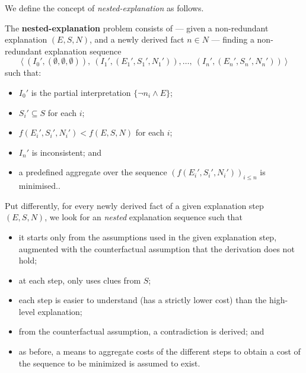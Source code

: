 




We define the concept of \emph{nested-explanation} as follows. 

\begin{definition}
The \textbf{nested-explanation} problem consists of --- given a non-redundant explanation $(E, S, N)$, and a newly derived fact $n \in N$ --- finding a non-redundant explanation sequence 
    \[\langle \ (I_0',(\emptyset,\emptyset,\emptyset)),\ (I_1',(E_1',S_1',N_1')), \dots ,\ (I_n',(E_n',S_n',N_n')) \ \rangle\]
    such that:
    \begin{itemize}
        \item $I_0'$ is the partial interpretation $\{ \neg n_i \wedge E \}$;
        \item $S_i'\subseteq S$ for each $i$;
        \item $f(E_i',S_i',N_i')< f(E, S, N)$ for each $i$; 
        \item $I_n'$ is inconsistent; and
        \item a predefined aggregate over the sequence $\left(f(E_i',S_i',N_i')\right)_{i\leq n}$ is minimised..
    \end{itemize}
\end{definition}

Put differently, for every newly derived fact of a given explanation step $(E, S, N)$, we look for an \emph{nested} explanation sequence such that 
\begin{itemize}
 \item it starts only from the assumptions used in the given explanation step, augmented with the counterfactual assumption that the derivation does not hold; 
 \item at each step, only uses clues from $S$;
 \item each step is easier to understand (has a strictly lower cost) than the high-level explanation;
 \item from the counterfactual assumption, a contradiction is derived; and
 \item as before, a means to aggregate costs of the different steps to obtain a cost of the sequence to be minimized is assumed to exist.
\end{itemize}

